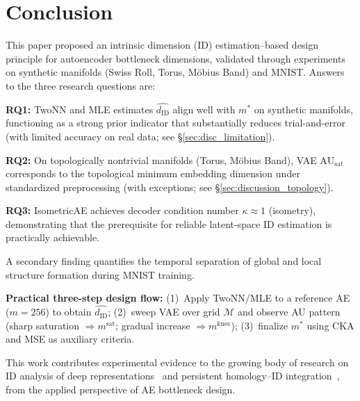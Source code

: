 \documentclass[lettersize,journal]{IEEEtran}
\newcommand{\dID}{d_{\mathrm{ID}}}
\newcommand{\kap}{\kappa}
\newcommand{\AUsat}{\mathrm{AU}_{\mathrm{sat}}}
\begin{document}
\section{Conclusion}\label{sec:conclusion}

This paper proposed an intrinsic dimension (ID) estimation--based design principle for autoencoder bottleneck dimensions, validated through experiments on synthetic manifolds (Swiss Roll, Torus, M\"{o}bius Band) and MNIST.
Answers to the three research questions are:

\textbf{RQ1:} TwoNN and MLE estimates $\hat{\dID}$ align well with $m^*$ on synthetic manifolds, functioning as a strong prior indicator that substantially reduces trial-and-error (with limited accuracy on real data; see \S\ref{sec:disc_limitation}).

\textbf{RQ2:} On topologically nontrivial manifolds (Torus, M\"{o}bius Band), VAE $\AUsat$ corresponds to the topological minimum embedding dimension under standardized preprocessing (with exceptions; see \S\ref{sec:discussion_topology}).

\textbf{RQ3:} IsometricAE achieves decoder condition number $\kap \approx 1$ (isometry), demonstrating that the prerequisite for reliable latent-space ID estimation is practically achievable.

A secondary finding quantifies the temporal separation of global and local structure formation during MNIST training.

\textbf{Practical three-step design flow:}
(1)~Apply TwoNN/MLE to a reference AE ($m=256$) to obtain $\hat{\dID}$;
(2)~sweep VAE over grid $\mathcal{M}$ and observe AU pattern (sharp saturation $\Rightarrow m^\mathrm{sat}$; gradual increase $\Rightarrow m^\mathrm{knee}$);
(3)~finalize $m^*$ using CKA and MSE as auxiliary criteria.

This work contributes experimental evidence to the growing body of research on ID analysis of deep representations~\cite{ansuini2019intrinsic,valeriani2023geometry} and persistent homology--ID integration~\cite{birdal2021intrinsic,carlsson2009topology}, from the applied perspective of AE bottleneck design.
\end{document}

